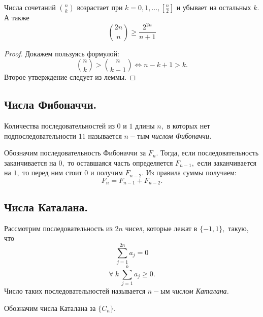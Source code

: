\begin{proposition}
    Числа сочетаний $\binom{n}{k}$ возрастает при $k = 0, 1, \ldots, [\frac{n}{2}]$ и убывает на остальных $k.$ А также $$\binom{2n}{n} \geq \frac{2^{2n}}{n + 1}$$
\end{proposition}

\begin{proof}
    Докажем пользуясь формулой:
    $$\binom{n}{k} > \binom{n}{k - 1} \Longleftrightarrow n - k + 1 > k.$$ 
    Второе утверждение следует из леммы.
\end{proof}

\subsection{Числа Фибоначчи.}

\begin{definition}
    Количества последовательностей из $0$ и $1$ длины $n,$ в которых нет подпоследовательности $11$ называется $n-$тым \textit{числом Фибоначчи.}
\end{definition}

Обозначим последовательность Фибоначчи за $F_{n}.$ Тогда, если последовательность заканчивается на $0,$ то оставшаяся часть определяется $F_{n - 1},$ если заканчивается на $1,$ то перед ним стоит $0$ и получим $F_{n - 2}.$ Из правила суммы получаем:
$$F_{n} = F_{n - 1} + F_{n - 2}.$$

\subsection{Числа Каталана.}

\begin{definition}
    Рассмотрим последовательность из $2n$ чисел, которые лежат в $\{ -1, 1\},$ такую, что
    $$\sum_{j = 1} ^ {2n} a_j = 0$$
    $$\forall \ k \ \sum_{j = 1}^{k} a_j \geq 0.$$
    Число таких последовательностей называется $n-$ым \textit{числом Каталана.}
\end{definition}

Обозначим числа Каталана за $\{ C_n \}.$